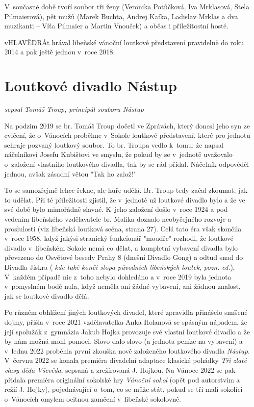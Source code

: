 \documentclass[a5paper, 11pt, twoside]{article}
\newcommand{\pozned}[1]{%
\textit{#1}}
\begin{document}
V~současné době tvoří soubor tři ženy (Veronika Potůčková, Iva
Mrklasová, Stela Pilmaierová), pět mužů (Marek Buchta, Andrej Kafka,
Ladislav Mrklas a dva muzikanti -- Víťa Pilmaier a Martin Vnouček) a
občas i příležitostní hosté.

vHLAVĚDRÁt hrával libeňské vánoční loutkové představení pravidelně do
roku 2014 a pak ještě jednou v~roce 2018.

\section{Loutkové divadlo Nástup}

\begin{center}
  \textit{sepsal Tomáš Troup, principál souboru Nástup}
\end{center}

Na podzim 2019 se br. Tomáš Troup dočetl ve Zprávách, který donesl jeho
syn ze cvičení, že o~Vánocích proběhne v~Sokole loutkové představení,
které pro jednotu sehraje pozvaný loutkový soubor. To br. Troupa vedlo
k~tomu, že napsal náčelníkovi Josefu Kubištovi ve smyslu, že pokud by se
v~jednotě uvažovalo o~založení vlastního loutkového divadla, tak by se rád
přidal. Náčelník odpověděl jednou, avšak zásadní větou "Tak ho
založ!"

To se samozřejmě lehce řekne, ale hůře udělá. Br. Troup tedy začal
zkoumat, jak to udělat. Při té příležitosti zjistil, že v~jednotě už
loutkové divadlo bylo a že ve své době bylo mimořádně slavné. K~jeho
založení došlo v~roce 1924 a pod vedením libeňského vzdělavatele br.
Malíka doznalo neobyčejného rozvoje a proslulosti (viz libeňská loutková
scéna, strana 27). Celá tato éra však skončila
v~roce 1958, když jakýsi stranický funkcionář "moudře" rozhodl, že
loutkové divadlo v~libeňském Sokole nemá co dělat, a kompletní vybavení
divadla bylo převezeno do Osvětové besedy Prahy 8 (dnešní Divadlo Gong)
a odtud snad do Divadla Jiskra (\pozned{kde také končí stopa původních
libeňských loutek, pozn. ed.}). V~každém případě nic z~toho nebylo
dohledáno a v~roce 2019 byla jednota v~pomyslném bodě nula, když neměla
ani žádné vybavení, ani žádnou znalost, jak se loutkové divadlo dělá.

Po různém obhlížení jiných loutkových divadel, které zpravidla přinášelo
smíšené dojmy, přišla v~roce 2021 vzdělavatelka Anka Holanová se spásným
nápadem, že její spolužák z~gymnázia Jakub Hojka provozuje své vlastní
loutkové divadlo a že by nám možná mohl pomoci. Slovo dalo slovo (a
jednota peníze na vybavení) a v~lednu 2022 proběhla první zkouška nově
založeného loutkového divadla \textit{Nástup}. V~červnu 2022 se konala
premiéra divadelní adaptace klasické pohádky \textit{Tři zlaté vlasy děda
Vševěda}, sepsaná a zrežírovaná J. Hojkou. Na Vánoce 2022 se pak přidala
premiéra originální sokolské hry \textit{Vánoční sokol} (opět pod
autorstvím a režií J. Hojky), pojednávající o~tom, co se může stát,
pokud se tři malí sokolíci o~Vánocích omylem ocitnou zamčení v~libeňské
sokolovně.
\end{document}
